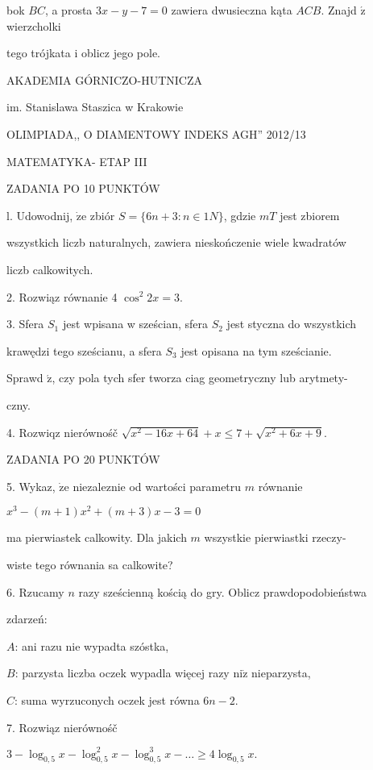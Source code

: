\documentclass[a4paper,12pt]{article}
\begin{document}
bok $BC$, a prosta $3x-y-7=0$ zawiera dwusieczna kąta $ACB.$ Znajd $\acute{\mathrm{z}}$ wierzcholki

tego trójkata i oblicz jego pole.






AKADEMIA GÓRNICZO-HUTNICZA

im. Stanislawa Staszica w Krakowie

OLIMPIADA,, O DIAMENTOWY INDEKS AGH'' 2012/13

MATEMATYKA- ETAP III

ZADANIA PO 10 PUNKTÓW

l. Udowodnij, $\dot{\mathrm{z}}\mathrm{e}$ zbiór $S= \{6n+3:n\in 1N\}$, gdzie $mT$ jest zbiorem

wszystkich liczb naturalnych, zawiera nieskończenie wiele kwadratów

liczb calkowitych.

2. Rozwiąz równanie 4 $\cos^{2}2x=3.$

3. Sfera $S_{1}$ jest wpisana w sześcian, sfera $S_{2}$ jest styczna do wszystkich

krawędzi tego sześcianu, a sfera $S_{3}$ jest opisana na tym sześcianie.

Sprawd $\acute{\mathrm{z}}$, czy pola tych sfer tworza ciag geometryczny lub arytmety-

czny.

4. Rozwiqz nierównośč $\sqrt{x^{2}-16x+64}+x\leq 7+\sqrt{x^{2}+6x+9}.$

ZADANIA PO 20 PUNKTÓW

5. Wykaz, $\dot{\mathrm{z}}\mathrm{e}$ niezaleznie od wartości parametru $m$ równanie

$x^{3}-(m+1)x^{2}+(m+3)x-3=0$

ma pierwiastek calkowity. Dla jakich $m$ wszystkie pierwiastki rzeczy-

wiste tego równania sa calkowite?

6. Rzucamy $n$ razy sześcienną kością do gry. Oblicz prawdopodobieństwa

zdarzeń:

$A$: ani razu nie wypadta szóstka,

$B$: parzysta liczba oczek wypadla więcej razy $\mathrm{n}\mathrm{i}\dot{\mathrm{z}}$ nieparzysta,

$C$: suma wyrzuconych oczek jest równa $6n-2.$

7. Rozwiąz nierównośč

$3-\log_{0,5}x-\log_{0,5}^{2}x-\log_{0,5}^{3}x-\ldots\geq 4\log_{0,5}x.$
\end{document}

